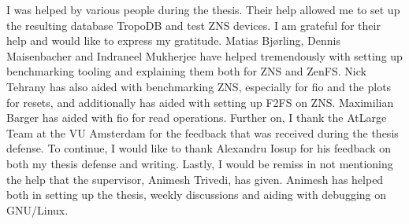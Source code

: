 \begin{acknowledgements}
    \label{sec:acknowledgement}
    I was helped by various people during the thesis. Their help allowed me to set up the resulting database TropoDB and test ZNS devices. I am grateful for their help and would like to express my gratitude. Matias Bj{\o}rling, Dennis Maisenbacher and Indraneel Mukherjee have helped tremendously with setting up benchmarking tooling and explaining them both for ZNS and ZenFS. Nick Tehrany has also aided with benchmarking ZNS, especially for fio and the plots for resets, and additionally has aided with setting up F2FS on ZNS. Maximilian Barger has aided with fio for read operations. Further on, I thank the AtLarge Team at the VU Amsterdam for the feedback that was received during the thesis defense. To continue, I would like to thank Alexandru Iosup for his feedback on both my thesis defense and writing.  Lastly, I would be remiss in not mentioning the help that the supervisor, Animesh Trivedi, has given. Animesh has helped both in setting up the thesis, weekly discussions and aiding with debugging on GNU/Linux. 
    \end{acknowledgements}